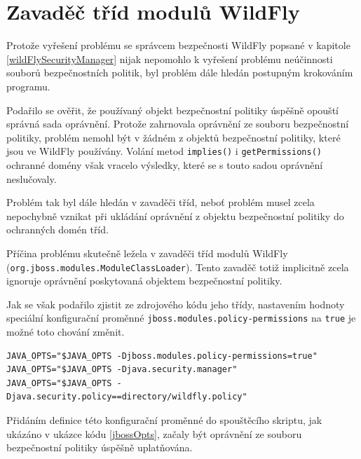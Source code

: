 \section{Zavaděč tříd modulů WildFly} \label{moduleClassLoader}

Protože vyřešení problému se správcem bezpečnosti WildFly popsané v kapitole \ref{wildFlySecurityManager} nijak nepomohlo k vyřešení problému
neúčinnosti souborů bezpečnostních politik, byl problém dále hledán postupným krokováním programu.

Podařilo se ověřit, že používaný objekt bezpečnostní politiky úspěšně opouští správná sada oprávnění. Protože zahrnovala oprávnění ze souboru bezpečnostní politiky, problém nemohl být v žádném z objektů bezpečnostní politiky, které jsou ve WildFly používány. Volání metod {\tt implies()} i {\tt getPermissions()} ochranné domény však vracelo výsledky, které se s touto sadou oprávnění neslučovaly.

Problém tak byl dále hledán v zavaděči tříd, neboť problém musel zcela nepochybně vznikat při ukládání oprávnění z objektu bezpečnostní politiky do ochranných domén tříd.

Příčina problému skutečně ležela v zavaděči tříd modulů WildFly ({\tt org.jboss.modules.\linebreak ModuleClassLoader}).
Tento zavaděč totiž implicitně zcela ignoruje oprávnění poskytovaná objektem bezpečnostní politiky.

Jak se však podařilo zjistit ze zdrojového kódu jeho třídy, nastavením hodnoty speciální konfigurační proměnné {\tt jboss.modules.policy-permissions} na {\tt true} je možné toto chování změnit. \cite{sourceModuleClassLoader}

\begin{lstlisting}[caption=Úprava spouštěcího skriptu pro spuštění se souborem bezpečnostní politiky, label=jbossOpts]
JAVA_OPTS="$JAVA_OPTS -Djboss.modules.policy-permissions=true"
JAVA_OPTS="$JAVA_OPTS -Djava.security.manager"
JAVA_OPTS="$JAVA_OPTS -Djava.security.policy==directory/wildfly.policy"
\end{lstlisting}

Přidáním definice této konfigurační proměnné do spouštěcího skriptu, jak ukázáno v ukázce kódu \ref{jbossOpts}, začaly být oprávnění ze souboru bezpečnostní politiky úspěšně uplatňována.


